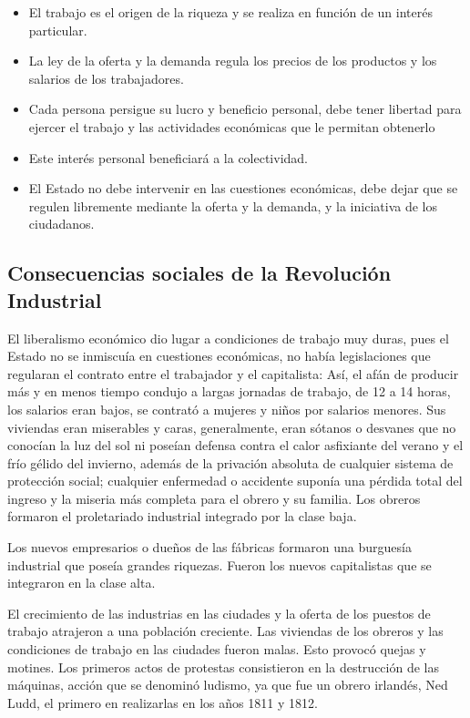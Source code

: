 \documentclass{article}
\begin{document}
{  \begin{itemize}
      \item El trabajo es el origen de la riqueza y se realiza en función de un interés particular.
      \item La ley de la oferta y la demanda regula los precios de los productos y los salarios de los trabajadores.
      \item Cada persona persigue su lucro y beneficio personal, debe tener libertad para ejercer el trabajo y las actividades económicas que le permitan obtenerlo\item Este interés personal beneficiará a la colectividad.
      \item El Estado no debe intervenir en las cuestiones económicas, debe dejar que se regulen libremente mediante la oferta y la demanda, y la iniciativa de los ciudadanos.
  
  \end{itemize}

  \subsection*{Consecuencias sociales de la Revolución Industrial}
  El liberalismo económico dio lugar a condiciones de trabajo muy duras, pues el Estado no se inmiscuía en cuestiones económicas, no había legislaciones que regularan el contrato entre el trabajador y el capitalista: Así, el afán de producir más y en menos tiempo condujo a largas jornadas de trabajo, de 12 a 14 horas, los salarios eran bajos, se contrató a mujeres y niños por salarios menores. Sus viviendas eran miserables y caras, generalmente, eran sótanos o desvanes que no conocían la luz del sol ni poseían defensa contra el calor asfixiante del verano y el frío gélido del invierno, además de la privación absoluta de cualquier sistema de protección social; cualquier enfermedad o accidente suponía una pérdida total del ingreso y la miseria más completa para el obrero y su familia. Los obreros formaron el proletariado industrial integrado por la clase baja.

  Los nuevos empresarios o dueños de las fábricas formaron una burguesía industrial que poseía grandes riquezas. Fueron los nuevos capitalistas que se integraron en la clase alta.

  El crecimiento de las industrias en las ciudades y la oferta de los puestos de trabajo atrajeron a una población creciente. Las viviendas de los obreros y las condiciones de trabajo en las ciudades fueron malas. Esto provocó quejas y motines. Los primeros actos de protestas consistieron en la destrucción de las máquinas, acción que se denominó ludismo, ya que fue un obrero irlandés, Ned Ludd, el primero en realizarlas en los años 1811 y 1812.
  
}
\end{document}
